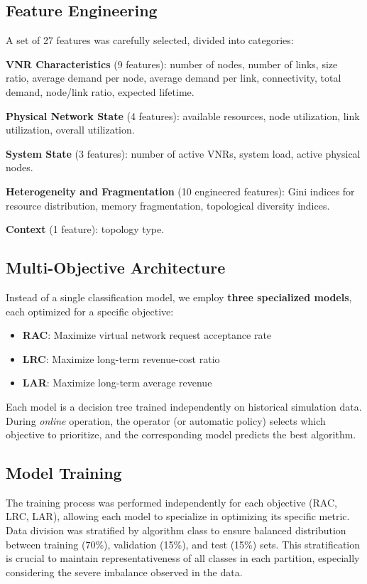 \documentclass[conference]{IEEEtran}
\begin{document}
\subsection{Feature Engineering}

A set of 27 features was carefully selected, divided into categories:

\textbf{VNR Characteristics} (9 features): number of nodes, number of links, size ratio, average demand per node, average demand per link, connectivity, total demand, node/link ratio, expected lifetime.

\textbf{Physical Network State} (4 features): available resources, node utilization, link utilization, overall utilization.

\textbf{System State} (3 features): number of active VNRs, system load, active physical nodes.

\textbf{Heterogeneity and Fragmentation} (10 engineered features): Gini indices for resource distribution, memory fragmentation, topological diversity indices.

\textbf{Context} (1 feature): topology type.

\subsection{Multi-Objective Architecture}

Instead of a single classification model, we employ \textbf{three specialized models}, each optimized for a specific objective:

\begin{itemize}
    \item \textbf{RAC}: Maximize virtual network request acceptance rate
    \item \textbf{LRC}: Maximize long-term revenue-cost ratio
    \item \textbf{LAR}: Maximize long-term average revenue
\end{itemize}

Each model is a decision tree trained independently on historical simulation data. During \textit{online} operation, the operator (or automatic policy) selects which objective to prioritize, and the corresponding model predicts the best algorithm.

\subsection{Model Training}

The training process was performed independently for each objective (RAC, LRC, LAR), allowing each model to specialize in optimizing its specific metric. Data division was stratified by algorithm class to ensure balanced distribution between training (70\%), validation (15\%), and test (15\%) sets. This stratification is crucial to maintain representativeness of all classes in each partition, especially considering the severe imbalance observed in the data.
\end{document}

